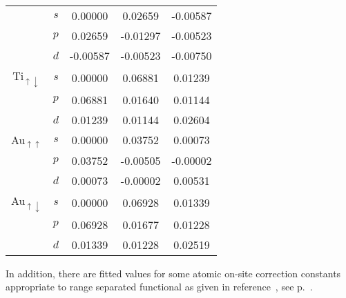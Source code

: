 \begin{center}
\begin{small}
\begin{tabular}{|cc|ccc|}
&$s$ & 0.00000& 0.02659&-0.00587\\
&$p$ & 0.02659&-0.01297&-0.00523\\
&$d$ &-0.00587&-0.00523&-0.00750\\\cline{3-5}
Ti$_{\uparrow\downarrow}$
&$s$ &0.00000& 0.06881& 0.01239\\
&$p$ &0.06881& 0.01640& 0.01144\\
&$d$ &0.01239& 0.01144& 0.02604\\\hline
Au$_{\uparrow\uparrow}$
&$s$ &0.00000& 0.03752& 0.00073\\
&$p$ &0.03752&-0.00505&-0.00002\\
&$d$ &0.00073&-0.00002& 0.00531\\\cline{3-5}
Au$_{\uparrow\downarrow}$
&$s$ &0.00000& 0.06928& 0.01339\\
&$p$ &0.06928& 0.01677& 0.01228\\
&$d$ &0.01339& 0.01228& 0.02519\\\hline
\end{tabular}
\end{small}
\end{center}

In addition, there are fitted values for some atomic on-site correction constants
appropriate to range separated functional as given in reference~\cite{Lee_JCTC_2022},
see p.~.

